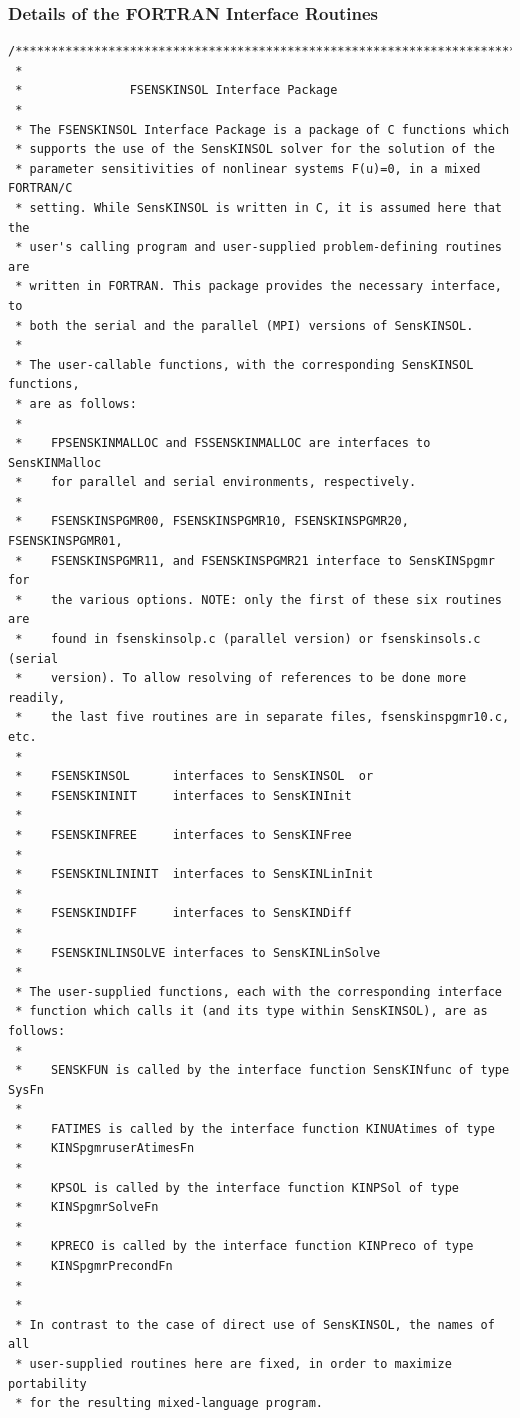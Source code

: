 \documentclass[11pt]{article}
\begin{document}
\subsubsection{Details of the FORTRAN Interface Routines}
\small
\begin{verbatim}
/***************************************************************************
 *
 *               FSENSKINSOL Interface Package
 *
 * The FSENSKINSOL Interface Package is a package of C functions which
 * supports the use of the SensKINSOL solver for the solution of the
 * parameter sensitivities of nonlinear systems F(u)=0, in a mixed FORTRAN/C
 * setting. While SensKINSOL is written in C, it is assumed here that the
 * user's calling program and user-supplied problem-defining routines are
 * written in FORTRAN. This package provides the necessary interface, to
 * both the serial and the parallel (MPI) versions of SensKINSOL.
 *
 * The user-callable functions, with the corresponding SensKINSOL functions,
 * are as follows:
 *
 *    FPSENSKINMALLOC and FSSENSKINMALLOC are interfaces to SensKINMalloc
 *    for parallel and serial environments, respectively.
 *
 *    FSENSKINSPGMR00, FSENSKINSPGMR10, FSENSKINSPGMR20, FSENSKINSPGMR01,
 *    FSENSKINSPGMR11, and FSENSKINSPGMR21 interface to SensKINSpgmr for
 *    the various options. NOTE: only the first of these six routines are
 *    found in fsenskinsolp.c (parallel version) or fsenskinsols.c (serial
 *    version). To allow resolving of references to be done more readily,
 *    the last five routines are in separate files, fsenskinspgmr10.c, etc.
 *
 *    FSENSKINSOL      interfaces to SensKINSOL  or
 *    FSENSKININIT     interfaces to SensKINInit
 *
 *    FSENSKINFREE     interfaces to SensKINFree
 *
 *    FSENSKINLININIT  interfaces to SensKINLinInit
 *
 *    FSENSKINDIFF     interfaces to SensKINDiff
 *
 *    FSENSKINLINSOLVE interfaces to SensKINLinSolve
 *
 * The user-supplied functions, each with the corresponding interface
 * function which calls it (and its type within SensKINSOL), are as follows:
 *
 *    SENSKFUN is called by the interface function SensKINfunc of type SysFn
 *
 *    FATIMES is called by the interface function KINUAtimes of type
 *    KINSpgmruserAtimesFn
 *
 *    KPSOL is called by the interface function KINPSol of type
 *    KINSpgmrSolveFn
 *
 *    KPRECO is called by the interface function KINPreco of type
 *    KINSpgmrPrecondFn
 *
 *
 * In contrast to the case of direct use of SensKINSOL, the names of all
 * user-supplied routines here are fixed, in order to maximize portability
 * for the resulting mixed-language program.

\end{verbatim}
\end{document}
